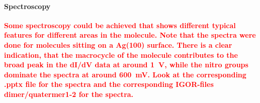 	
	\paragraph{Spectroscopy}
	\textcolor{red}{\textbf{
			Some spectroscopy could be achieved that shows different typical features for different areas in the molecule. Note that the spectra were done for molecules sitting on a Ag(100) surface.
			There is a clear indication, that the macrocycle of the molecule contributes to the broad peak in the dI/dV data at around \SI{1}{\V}, while the nitro groups dominate the spectra at around \SI{600}{\milli \V}. 
			Look at the corresponding .pptx file for the spectra and the corresponding IGOR-files dimer/quatermer1-2 for the spectra.
		}
	}
